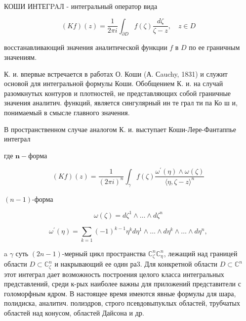 \documentclass[10pt]{article}
\begin{document}
КОШИ ИНТЕГPAЛ - интегральный оператор вида



\[

(K f)(z)=\frac{1}{2 \pi i} \int_{\partial D} f(\zeta) \frac{d \zeta}{\zeta-z}, \quad z \in D

\]



восстанавливающий значения аналитической функции $f$ в $D$ по ее граничным значениям.



К. и. впервые встречается в работах О. Коши (А. Сauchy, 1831) и служит основой для интегральной формулы Коши. Обобщением К. и. на случай разомкнутых контуров и плотностей, не представляющих собой граничные значения аналитич. функций, является сингулярный ин те грал ти па Ко ш и, понимаемый в смысле главного значения.



В пространственном случае аналогом К. и. выступает Коши-Лере-Фантаппье интеграл



где $\boldsymbol{n}-ф о р м а$



\[

(K f)(z)=\frac{1}{(2 \pi i)^{n}} \int_{\gamma} f(\zeta) \frac{\omega^{\prime}(\eta) \wedge \omega(\zeta)}{\langle\eta, \zeta-z\rangle^{n}}

\]



$(n-1)$-форма



\[

\omega(\zeta)=d \zeta^{1} \wedge \ldots \wedge d \zeta^{n}

\]



\[

\omega^{\prime}(\eta)=\sum_{k=1}(-1)^{k-1} \eta^{k} d \eta^{1} \wedge \ldots \wedge d \eta^{k} \wedge \ldots \wedge d \eta^{n},

\]



a $\gamma$ суть $(2 n-1)$-мерный цикл пространства $\mathbb{C}_{\zeta}^{n} \mathbb{C}_{\eta}^{n}$, лежащий над границей области $D \subset \mathbb{C}_{\zeta}^{n}$ и накрывающий ее один ра3. Для конкретной области $D \subset \mathbb{C}^{n}$ этот интеграл дает возможность построения целого класса интегральных представлений, среди к-рых наиболее важны для приложений представители с голоморфным ядром. В настоящее время имеются явные формулы для шара, полидиска, аналитич. полиэдров, строго псевдовыпуклых областей, трубчатых областей над конусом, областей Дайсона и др.
\end{document}
